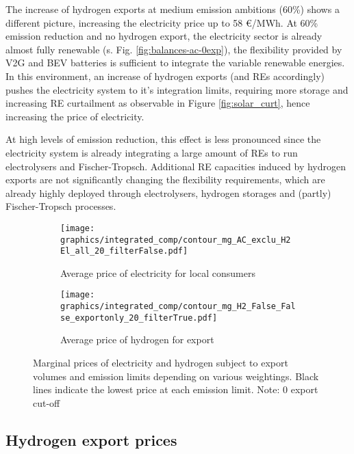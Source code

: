 The increase of hydrogen exports at medium emission ambitions (60\%) shows a different picture, increasing the electricity price up to 58 €/MWh. At 60\% emission reduction and no hydrogen export, the electricity sector is already almost fully renewable (s. Fig. \ref{fig:balances-ac-0exp}), the flexibility provided by V2G and BEV batteries is sufficient to integrate the variable renewable energies. In this environment, an increase of hydrogen exports (and REs accordingly) pushes the electricity system to it's integration limits, requiring more storage and increasing RE curtailment as observable in Figure \ref{fig:solar_curt}, hence increasing the price of electricity.

At high levels of emission reduction, this effect is less pronounced since the electricity system is already integrating a large amount of REs to run electrolysers and Fischer-Tropsch. Additional RE capacities induced by hydrogen exports are not significantly changing the flexibility requirements, which are already highly deployed through electrolysers, hydrogen storages and (partly) Fischer-Tropsch processes.

\begin{figure*}[h!] %
    \centering
    \begin{subfigure}[b]{0.49\linewidth}
        \centering
        \texttt{[image: graphics/integrated\_comp/contour\_mg\_AC\_exclu\_H2 El\_all\_20\_filterFalse.pdf]}
        \caption{Average price of electricity for local consumers}
        \label{fig:local_el_price}
    \end{subfigure}
    \hfill
    \begin{subfigure}[b]{0.49\linewidth}
        \centering
        \texttt{[image: graphics/integrated\_comp/contour\_mg\_H2\_False\_False\_exportonly\_20\_filterTrue.pdf]}
        \caption{Average price of hydrogen for export}
        \label{fig:export_hy_price}
    \end{subfigure}
    \hfill
    \caption{Marginal prices of electricity and hydrogen subject to export volumes and emission limits depending on various weightings. Black lines indicate the lowest price at each emission limit. Note: 0 export cut-off}
    \label{fig:marginal_prices}
\end{figure*}

\subsection{Hydrogen export prices}
\label{subsec:results_hy_prices}

